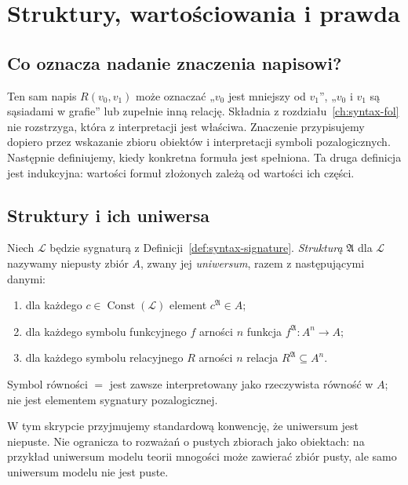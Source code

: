 \chapter{Struktury, wartościowania i prawda}\label{ch:semantics-fol}

\section{Co oznacza nadanie znaczenia napisowi?}
Ten sam napis $R(v_0,v_1)$ może oznaczać „$v_0$ jest mniejszy od $v_1$”,
„$v_0$ i $v_1$ są sąsiadami w grafie” lub zupełnie inną relację.
Składnia z rozdziału~\ref{ch:syntax-fol} nie rozstrzyga, która z interpretacji
jest właściwa. Znaczenie przypisujemy dopiero przez wskazanie zbioru obiektów
i interpretacji symboli pozalogicznych. Następnie definiujemy, kiedy
konkretna formuła jest spełniona. Ta druga definicja jest indukcyjna:
wartości formuł złożonych zależą od wartości ich części.

\section{Struktury i ich uniwersa}
\begin{definicja}\label{def:sem-structure}
Niech $\mathcal L$ będzie sygnaturą z Definicji~\ref{def:syntax-signature}.
\emph{Strukturą} $\mathfrak A$ dla $\mathcal L$ nazywamy niepusty zbiór $A$,
zwany jej \emph{uniwersum}, razem z następującymi danymi:
\begin{enumerate}[label=(\roman*)]
\item dla każdego $c\in\operatorname{Const}(\mathcal L)$ element
      $c^{\mathfrak A}\in A$;
\item dla każdego symbolu funkcyjnego $f$ arności $n$ funkcja
      $f^{\mathfrak A}:A^n\to A$;
\item dla każdego symbolu relacyjnego $R$ arności $n$ relacja
      $R^{\mathfrak A}\subseteq A^n$.
\end{enumerate}
Symbol równości $=$ jest zawsze interpretowany jako rzeczywista równość
w $A$; nie jest elementem sygnatury pozalogicznej.
\end{definicja}
W tym skrypcie przyjmujemy standardową konwencję, że uniwersum jest
niepuste. Nie ogranicza to rozważań o pustych zbiorach jako obiektach:
na przykład uniwersum modelu teorii mnogości może zawierać zbiór pusty,
ale samo uniwersum modelu nie jest puste.

